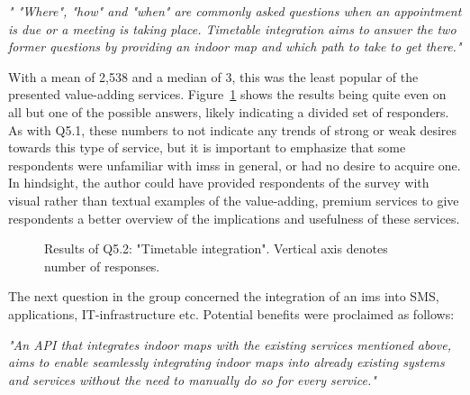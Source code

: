 \begin{displayquote}
\textit{" "Where", "how" and "when" are commonly asked questions when an appointment is due or a meeting is taking place. Timetable integration aims to answer the two former questions by providing an indoor map and which path to take to get there."}
\end{displayquote}

With a mean of 2,538 and a median of 3, this was the least popular of the presented value-adding services. Figure~\ref{fig:q52} shows the results being quite even on all but one of the possible answers, likely indicating a divided set of responders. As with Q5.1, these numbers to not indicate any trends of strong or weak desires towards this type of service, but it is important to emphasize that some respondents were unfamiliar with \glspl{ims} in general, or had no desire to acquire one. In hindsight, the author could have provided respondents of the survey with visual rather than textual examples of the value-adding, premium services to give respondents a better overview of the implications and usefulness of these services. 


\begin{figure}[H]
    \centering
    \caption{Results of Q5.2: "Timetable integration". Vertical axis denotes number of responses.}
    \label{fig:q52}
\end{figure}


The next question in the group concerned the integration of an \gls{ims} into SMS, applications, IT-infrastructure etc. Potential benefits were proclaimed as follows:

\begin{displayquote}
\textit{"An API that integrates indoor maps with the existing services mentioned above, aims to enable seamlessly integrating indoor maps into already existing systems and services without the need to manually do so for every service."}
\end{displayquote}

